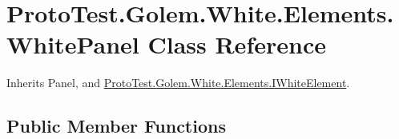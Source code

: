\hypertarget{class_proto_test_1_1_golem_1_1_white_1_1_elements_1_1_white_panel}{\section{Proto\-Test.\-Golem.\-White.\-Elements.\-White\-Panel Class Reference}
\label{class_proto_test_1_1_golem_1_1_white_1_1_elements_1_1_white_panel}
}


Inherits Panel, and \hyperlink{interface_proto_test_1_1_golem_1_1_white_1_1_elements_1_1_i_white_element}{Proto\-Test.\-Golem.\-White.\-Elements.\-I\-White\-Element}.

\subsection*{Public Member Functions}
